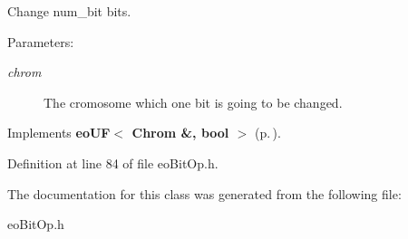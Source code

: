 Change num\_\-bit bits. 

\begin{Desc}
\item[Parameters:]
\begin{description}
\item[{\em chrom}]The cromosome which one bit is going to be changed. \end{description}
\end{Desc}


Implements {\bf eo\-UF$<$ Chrom \&, bool $>$} {\rm (p.\,\pageref{classeo_u_f_a1})}.

Definition at line 84 of file eo\-Bit\-Op.h.

The documentation for this class was generated from the following file:\begin{CompactItemize}
\item 
eo\-Bit\-Op.h\end{CompactItemize}
